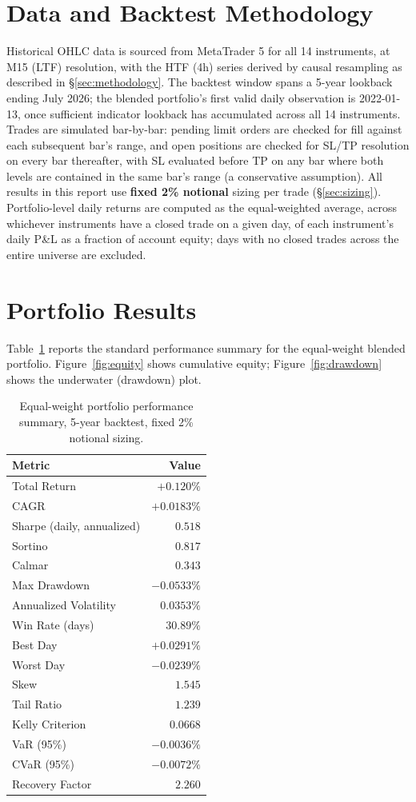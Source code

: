 \documentclass[11pt]{article}
\begin{document}
\section{Data and Backtest Methodology}
\label{sec:data}
Historical OHLC data is sourced from MetaTrader 5 for all 14 instruments, at M15 (LTF) resolution,
with the HTF (4h) series derived by causal resampling as described in \S\ref{sec:methodology}. The
backtest window spans a 5-year lookback ending July 2026; the blended portfolio's first valid daily
observation is 2022-01-13, once sufficient indicator lookback has accumulated across all 14
instruments. Trades are simulated bar-by-bar: pending limit orders are checked for fill against each
subsequent bar's range, and open positions are checked for SL/TP resolution on every bar thereafter,
with SL evaluated before TP on any bar where both levels are contained in the same bar's range (a
conservative assumption). All results in this report use \textbf{fixed 2\% notional} sizing per trade
(\S\ref{sec:sizing}). Portfolio-level daily returns are computed as the equal-weighted average, across
whichever instruments have a closed trade on a given day, of each instrument's daily P\&L as a fraction
of account equity; days with no closed trades across the entire universe are excluded.

\section{Portfolio Results}
\label{sec:results}
Table~\ref{tab:metrics} reports the standard performance summary for the equal-weight blended
portfolio. Figure~\ref{fig:equity} shows cumulative equity; Figure~\ref{fig:drawdown} shows the
underwater (drawdown) plot.

\begin{table}[H]
\centering
\caption{Equal-weight portfolio performance summary, 5-year backtest, fixed 2\% notional sizing.}
\label{tab:metrics}
\begin{tabular}{lr}
\toprule
Metric & Value \\
\midrule
Total Return & $+0.120\%$ \\
CAGR & $+0.0183\%$ \\
Sharpe (daily, annualized) & $0.518$ \\
Sortino & $0.817$ \\
Calmar & $0.343$ \\
Max Drawdown & $-0.0533\%$ \\
Annualized Volatility & $0.0353\%$ \\
Win Rate (days) & $30.89\%$ \\
Best Day & $+0.0291\%$ \\
Worst Day & $-0.0239\%$ \\
Skew & $1.545$ \\
Tail Ratio & $1.239$ \\
Kelly Criterion & $0.0668$ \\
VaR (95\%) & $-0.0036\%$ \\
CVaR (95\%) & $-0.0072\%$ \\
Recovery Factor & $2.260$ \\
\bottomrule
\end{tabular}
\end{table}
\end{document}
